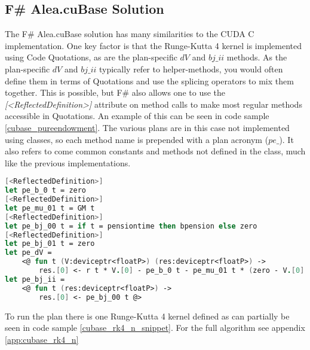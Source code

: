 \subsection{F\# Alea.cuBase Solution}
The F\# Alea.cuBase solution has many similarities to the CUDA C implementation.
One key factor is that the Runge-Kutta 4 kernel is implemented using Code Quotations, as are the plan-specific $dV$ and $bj\_ii$ methods.
As the plan-specific $dV$ and $bj\_ii$ typically refer to helper-methods, you would often define them in terms of Quotations and use the splicing operators to mix them together.
This is possible, but F\# also allows one to use the \textit{[\textless{}ReflectedDefinition\textgreater{}]} attribute on method calls to make most regular methods accessible in Quotations.
An example of this can be seen in code sample \ref{cubase_pureendowment}. 
The various plans are in this case not implemented using classes, so each method name is prepended with a plan acronym ($pe\_$).
It also refers to come common constants and methods not defined in the class, much like the previous implementations.

\begin{lstlisting}[language=FSharp, caption=The pure endowment insurance plan expressed in F\# Alea.cuBase, label=cubase_pureendowment]
[<ReflectedDefinition>] 
let pe_b_0 t = zero
[<ReflectedDefinition>]
let pe_mu_01 t = GM t
[<ReflectedDefinition>]
let pe_bj_00 t = if t = pensiontime then bpension else zero
[<ReflectedDefinition>]
let pe_bj_01 t = zero
let pe_dV = 
	<@ fun t (V:deviceptr<floatP>) (res:deviceptr<floatP>) -> 
		res.[0] <- r t * V.[0] - pe_b_0 t - pe_mu_01 t * (zero - V.[0] + pe_bj_01 t) @>
let pe_bj_ii = 
	<@ fun t (res:deviceptr<floatP>) ->
		res.[0] <- pe_bj_00 t @>
\end{lstlisting}

To run the plan there is one Runge-Kutta 4 kernel defined as can partially be seen in code sample \ref{cubase_rk4_n_snippet}. For the full algorithm see appendix \ref{app:cubase_rk4_n}

